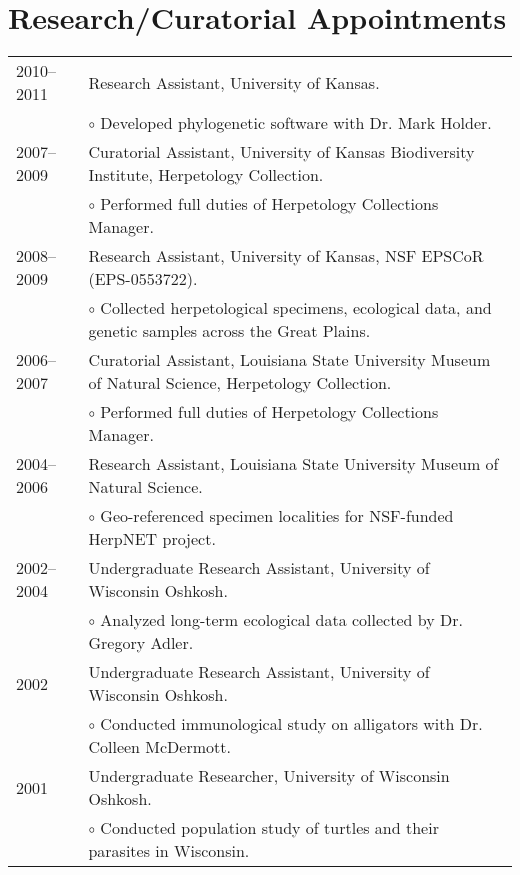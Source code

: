 \documentclass[10pt]{article}
\renewcommand{\labelitemi}{$\circ$}
\newcommand{\tableSubItem}{\addtolength{\leftskip}{1em} \labelitemi \xspace}
\begin{document}
\section*{Research/Curatorial Appointments}
\noindent\begin{tabulary}{\textwidth}{ @{} l L @{} }
2010--2011	& Research Assistant, University of Kansas. \\
            & \tableSubItem Developed phylogenetic software with Dr. Mark
              Holder. \\[0.25em]
2007--2009	& Curatorial Assistant, University of Kansas Biodiversity
              Institute, Herpetology Collection. \\
            & \tableSubItem Performed full duties of Herpetology Collections
              Manager. \\[0.25em]
2008--2009	& Research Assistant, University of Kansas, NSF EPSCoR
              (EPS-0553722). \\
            & \tableSubItem Collected herpetological specimens, ecological
              data, and genetic samples across the Great Plains. \\[0.25em]
2006--2007	& Curatorial Assistant, Louisiana State University Museum of
              Natural Science, Herpetology Collection. \\
            & \tableSubItem Performed full duties of Herpetology Collections
              Manager. \\[0.25em]
2004--2006	& Research Assistant, Louisiana State University Museum of Natural
              Science. \\
            & \tableSubItem Geo-referenced specimen localities for NSF-funded
              HerpNET project. \\[0.25em]
2002--2004	& Undergraduate Research Assistant, University of Wisconsin
              Oshkosh. \\
            & \tableSubItem Analyzed long-term ecological data collected by Dr.
              Gregory Adler. \\[0.25em]
2002		& Undergraduate Research Assistant, University of Wisconsin
              Oshkosh. \\
            & \tableSubItem Conducted immunological study on alligators with
              Dr. Colleen McDermott. \\[0.25em]
2001		& Undergraduate Researcher, University of Wisconsin Oshkosh. \\
            & \tableSubItem Conducted population study of turtles and their
              parasites in Wisconsin. \\
\end{tabulary}
\end{document}
